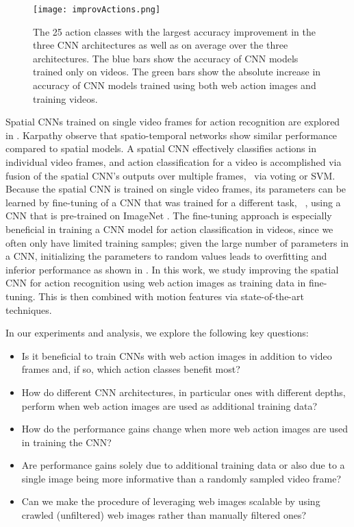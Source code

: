 \documentclass[10pt,twocolumn,letterpaper]{article}
\begin{document}
\begin{figure*}[t]
  \center
  \texttt{[image: improvActions.png]}\\
  \caption{The 25 action classes with the largest accuracy improvement in the three CNN architectures as well as on average over the three architectures. The blue bars show the accuracy of CNN models trained only on videos. The green bars show the absolute increase in accuracy of CNN models  trained using both web action images and training videos.} 
 \label{fig:improvActions}
\end{figure*} 

Spatial CNNs trained on single video frames for action recognition are explored in \cite{simonyan2014two}. Karpathy \etal \cite{KarpathyTSLSF14} observe that spatio-temporal networks show similar performance compared to spatial models. A spatial CNN effectively classifies actions in individual video frames, and action classification for a video is accomplished via fusion of the spatial CNN's outputs over multiple frames, \eg~via voting or SVM. Because the spatial CNN is trained on single video frames, its parameters can be learned by fine-tuning of a CNN that was trained for a different task, \eg~, using a CNN that is pre-trained on ImageNet \cite{deng2009imagenet}. 
The fine-tuning approach is especially beneficial in training a CNN model for action classification in videos, since we often only have limited training samples; given the large number of parameters in a CNN, initializing the parameters to random values leads to overfitting and inferior performance as shown in \cite{simonyan2014two}. In this work, we study improving the spatial CNN for action recognition using web action images as training data in fine-tuning. This is then combined with motion features via state-of-the-art techniques. 

In our experiments and analysis, we explore the following key questions:
\begin{itemize}
\item Is it beneficial to train CNNs with web action images in addition to video frames and, if so, which action classes benefit most?
\item How do different CNN architectures, in particular ones with different depths, perform when web action images are used as additional training data?
\item How do the performance gains change when more web action images are used in training the CNN?
\item Are performance gains solely due to additional training data or also due to a single image being more informative than a randomly sampled video frame?
\item Can we make the procedure of leveraging web images scalable by using crawled (unfiltered) web images rather than manually filtered ones?
\end{itemize}
\end{document}
